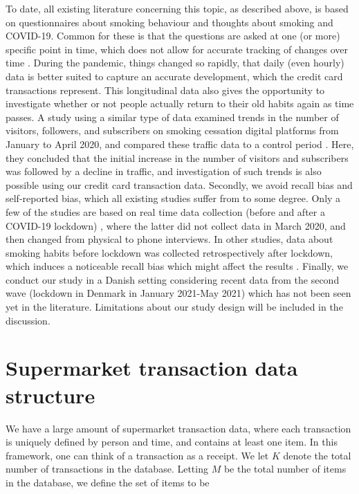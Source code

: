 \documentclass[
  11pt,
]{article}
\begin{document}
To date, all existing literature concerning this topic, as described
above, is based on questionnaires about smoking behaviour and thoughts
about smoking and COVID-19. Common for these is that the questions are
asked at one (or more) specific point in time, which does not allow for
accurate tracking of changes over time \cite{UK_inequalities}. During
the pandemic, things changed so rapidly, that daily (even hourly) data
is better suited to capture an accurate development, which the credit
card transactions represent. This longitudinal data also gives the
opportunity to investigate whether or not people actually return to
their old habits again as time passes. A study using a similar type of
data examined trends in the number of visitors, followers, and
subscribers on smoking cessation digital platforms from January to April
2020, and compared these traffic data to a control period
\cite{digital}. Here, they concluded that the initial increase in the
number of visitors and subscribers was followed by a decline in traffic,
and investigation of such trends is also possible using our credit card
transaction data. \newline Secondly, we avoid recall bias and
self-reported bias, which all existing studies suffer from to some
degree. Only a few of the studies are based on real time data collection
(before and after a COVID-19 lockdown) \cite{california, addiction},
where the latter did not collect data in March 2020, and then changed
from physical to phone interviews. In other studies, data about smoking
habits before lockdown was collected retrospectively after lockdown,
which induces a noticeable recall bias which might affect the results
\cite{UK_inequalities, turkish}. Finally, we conduct our study in a
Danish setting considering recent data from the second wave (lockdown in
Denmark in January 2021-May 2021) which has not been seen yet in the
literature. Limitations about our study design will be included in the
discussion.

\hypertarget{supermarket-transaction-data-structure}{%
\section{Supermarket transaction data
structure}\label{supermarket-transaction-data-structure}}

We have a large amount of supermarket transaction data, where each
transaction is uniquely defined by person and time, and contains at
least one item. In this framework, one can think of a transaction as a
receipt. We let \(K\) denote the total number of transactions in the
database. Letting \(M\) be the total number of items in the database, we
define the set of items to be
\end{document}
